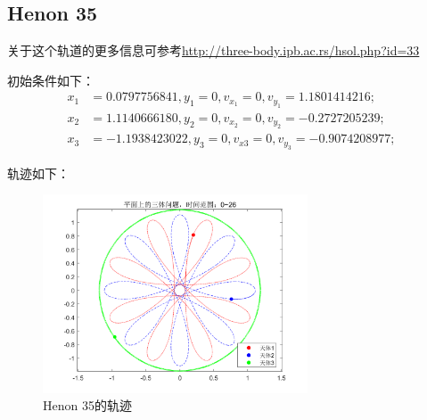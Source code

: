 \documentclass{article}
\begin{document}
\subsection{Henon 35}
\par 关于这个轨道的更多信息可参考\url{http://three-body.ipb.ac.rs/hsol.php?id=33}
\par 初始条件如下：
\begin{align*}
	x_1&= 0.0797756841 , y_1= 0,	v_{x_1}= 0, v_{y_1}= 1.1801414216;\\
	x_2&= 1.1140666180 , y_2= 0, 	v_{x_2}= 0, v_{y_2}= -0.2727205239;\\
	x_3&= -1.1938423022 ,y_3=0,		v_{x3}= 0, v_{y_3}= -0.9074208977;
\end{align*}
\par 轨迹如下：
\begin{figure}[H]
	\centering  %
	\includegraphics[width=0.7\textwidth]{一些优美的周期解//Henon 35}
	\caption{Henon 35的轨迹}
	\label{Henon_35}
\end{figure}
\end{document}
